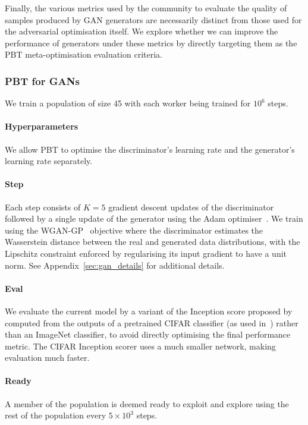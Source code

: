 \documentclass{article} %
\begin{document}
Finally, the various metrics used by the community to evaluate the quality of samples
produced by GAN generators are necessarily distinct from those used for the adversarial optimisation itself.
We explore whether we can improve the performance of generators under these metrics by directly targeting them
as the PBT meta-optimisation evaluation criteria.

\subsubsection{PBT for GANs}
We train a population of size 45 with each worker being trained for $10^6$ steps. 
\vspace{-0.5em}\paragraph{Hyperparameters}We allow PBT to optimise the discriminator's learning rate and the generator's learning rate separately. 
\vspace{-0.5em}\paragraph{Step}Each step consists of $K=5$ gradient descent updates of the discriminator followed by a single update of the generator
using the Adam optimiser~\citep{adam}.
We train using the WGAN-GP~\citep{improvedwgan} objective where the discriminator estimates the Wasserstein distance between the real and generated data distributions, with the Lipschitz constraint enforced by regularising its input gradient to have a unit norm.
See Appendix~\ref{sec:gan_details} for additional details. 
\vspace{-0.5em}\paragraph{Eval}We evaluate the current model by a variant of the Inception score proposed by~\citet{openaigan}
computed from the outputs of a pretrained CIFAR classifier (as used in~\citet{mihaelaalphagan})
rather than an ImageNet classifier,
to avoid directly optimising the final performance metric.
The CIFAR Inception scorer uses a much smaller network, making evaluation much faster. 
\vspace{-0.5em}\paragraph{Ready}A member of the population is deemed ready to exploit and explore using the rest of the population every $5\times10^3$ steps. 
\end{document}
